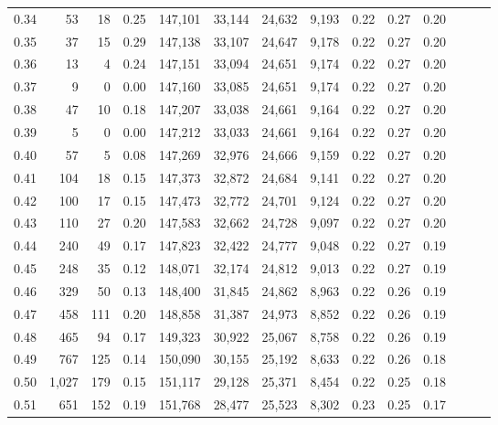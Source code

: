 \begin{tabular}{rrrrrrrrrrrrrr}
0.34 &      53 &     18 &  0.25 &  147,101 &   33,144 &  24,632 &   9,193 &  0.22 &  0.27 &      0.20 \\
0.35 &      37 &     15 &  0.29 &  147,138 &   33,107 &  24,647 &   9,178 &  0.22 &  0.27 &      0.20 \\
0.36 &      13 &      4 &  0.24 &  147,151 &   33,094 &  24,651 &   9,174 &  0.22 &  0.27 &      0.20 \\
0.37 &       9 &      0 &  0.00 &  147,160 &   33,085 &  24,651 &   9,174 &  0.22 &  0.27 &      0.20 \\
0.38 &      47 &     10 &  0.18 &  147,207 &   33,038 &  24,661 &   9,164 &  0.22 &  0.27 &      0.20 \\
0.39 &       5 &      0 &  0.00 &  147,212 &   33,033 &  24,661 &   9,164 &  0.22 &  0.27 &      0.20 \\
0.40 &      57 &      5 &  0.08 &  147,269 &   32,976 &  24,666 &   9,159 &  0.22 &  0.27 &      0.20 \\
0.41 &     104 &     18 &  0.15 &  147,373 &   32,872 &  24,684 &   9,141 &  0.22 &  0.27 &      0.20 \\
0.42 &     100 &     17 &  0.15 &  147,473 &   32,772 &  24,701 &   9,124 &  0.22 &  0.27 &      0.20 \\
0.43 &     110 &     27 &  0.20 &  147,583 &   32,662 &  24,728 &   9,097 &  0.22 &  0.27 &      0.20 \\
0.44 &     240 &     49 &  0.17 &  147,823 &   32,422 &  24,777 &   9,048 &  0.22 &  0.27 &      0.19 \\
0.45 &     248 &     35 &  0.12 &  148,071 &   32,174 &  24,812 &   9,013 &  0.22 &  0.27 &      0.19 \\
0.46 &     329 &     50 &  0.13 &  148,400 &   31,845 &  24,862 &   8,963 &  0.22 &  0.26 &      0.19 \\
0.47 &     458 &    111 &  0.20 &  148,858 &   31,387 &  24,973 &   8,852 &  0.22 &  0.26 &      0.19 \\
0.48 &     465 &     94 &  0.17 &  149,323 &   30,922 &  25,067 &   8,758 &  0.22 &  0.26 &      0.19 \\
0.49 &     767 &    125 &  0.14 &  150,090 &   30,155 &  25,192 &   8,633 &  0.22 &  0.26 &      0.18 \\
0.50 &   1,027 &    179 &  0.15 &  151,117 &   29,128 &  25,371 &   8,454 &  0.22 &  0.25 &      0.18 \\
0.51 &     651 &    152 &  0.19 &  151,768 &   28,477 &  25,523 &   8,302 &  0.23 &  0.25 &      0.17 \\

\end{tabular}
